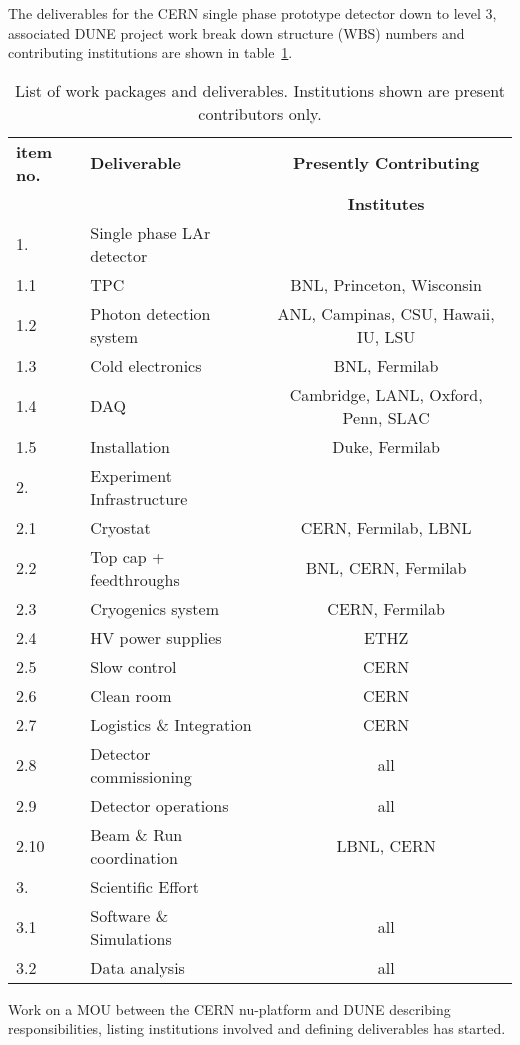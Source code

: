 The deliverables for the CERN single phase prototype detector down to level 3, associated DUNE project 
work break down structure (WBS)  numbers and contributing institutions are shown in table~\ref{tab:wbs}.
%
\begin{table}[h]
\centering
\begin{tabular}{|l l c|}
\hline
\textbf{item no. } & \textbf{Deliverable}  & \textbf{Presently Contributing}  \\ 
 &   & \textbf{Institutes}  \\ \hline

1. & Single phase LAr detector & \\
1.1 & TPC & BNL, Princeton, Wisconsin \\
1.2 & Photon detection system  &  ANL, Campinas, CSU, Hawaii, IU, LSU \\
1.3 & Cold electronics  & BNL, Fermilab  \\ 
1.4 &  DAQ & Cambridge, LANL, Oxford, Penn, SLAC  \\
1.5 & Installation & Duke, Fermilab  \\ \hline


2. & Experiment Infrastructure  &   \\
2.1 & Cryostat &  CERN, Fermilab, LBNL \\
2.2 & Top cap + feedthroughs &  BNL, CERN, Fermilab \\
2.3 & Cryogenics system  &  CERN, Fermilab \\
2.4 &  HV power supplies  &  ETHZ \\
2.5 &  Slow control  &  CERN \\
2.6 &  Clean room & CERN   \\ 
2.7 &  Logistics \& Integration & CERN  \\ 
2.8 &  Detector commissioning  &  all  \\ 
2.9 &  Detector operations &  all  \\ 
2.10 &  Beam \& Run coordination &  LBNL, CERN \\ \hline

3. & Scientific Effort &    \\ 
3.1 & Software \& Simulations &  all  \\
3.2 & Data analysis &  all  \\ \hline

\end{tabular}
\caption{List of work packages and deliverables. Institutions shown are present contributors only.} 

\label{tab:wbs}
\end{table}
%
Work on a MOU between the CERN nu-platform and DUNE describing responsibilities, listing institutions involved and defining deliverables has started. 



